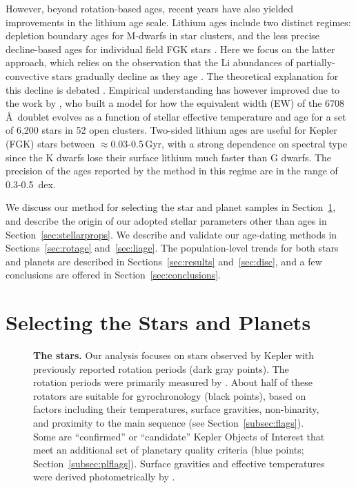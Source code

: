 \documentclass[11pt,twocolumn,tighten]{aastex63}
\begin{document}
However, beyond rotation-based ages, recent years have also yielded
improvements in the lithium age scale.  Lithium ages include two
distinct regimes: depletion boundary ages for M-dwarfs in star
clusters, and the less precise decline-based ages for individual field
FGK stars \citep{Soderblom_2010}.  Here we focus on the latter
approach, which relies on the observation that the Li abundances of
partially-convective stars gradually decline as they age
\citep[e.g.][]{2005A&A...442..615S}.  The theoretical explanation for
this decline is debated
\citep[e.g.][]{1995ApJ...441..865C,2010ApJ...716.1269D,2019MNRAS.485.4052C}.
Empirical understanding has however improved due to the work by
\citet{Jeffries_2023}, who built a model for how the equivalent width
(EW) of the  6708\,\AA\ doublet evolves as a function of
stellar effective temperature and age for a set of 6{,}200 stars in 52
open clusters.  Two-sided lithium ages are useful for Kepler (FGK)
stars between $\approx$0.03-0.5\,Gyr, with a strong dependence on
spectral type since the K dwarfs lose their surface lithium much
faster than G dwarfs.  The precision of the ages reported by the
\citet{Jeffries_2023} method in this regime are in the range of
0.3-0.5~dex.

We discuss our method for selecting the star and planet samples in
Section~\ref{sec:selection}, and describe the origin of our adopted
stellar parameters other than ages in Section~\ref{sec:stellarprops}.
We describe and validate our age-dating methods in
Sections~\ref{sec:rotage} and~\ref{sec:liage}.  The population-level
trends for both stars and planets are described in
Sections~\ref{sec:results} and~\ref{sec:disc}, and a few conclusions
are offered in Section~\ref{sec:conclusions}.


\section{Selecting the Stars and Planets}
\label{sec:selection}


\begin{figure*}[!t]
	\begin{center}
	\end{center}
	\vspace{-0.5cm}
	\caption{
    {\bf The stars.}  Our analysis focuses on stars observed by Kepler
    with previously reported rotation periods (dark gray points).  The
    rotation periods were primarily measured by
    \citet{Santos_2019,Santos_2021}.  About half of these rotators are
    suitable for gyrochronology (black points), based on factors
    including their temperatures, surface gravities, non-binarity, and
    proximity to the main sequence (see Section~\ref{subsec:flags}).
    Some are ``confirmed'' or ``candidate'' Kepler Objects of Interest
    that meet an additional set of planetary quality criteria (blue
    points; Section~\ref{subsec:plflags}).  Surface gravities and
    effective temperatures were derived photometrically by
    \citet{Berger_2020a_catalog}.
	}
	\label{fig:stellarprops}
\end{figure*}
\end{document}
